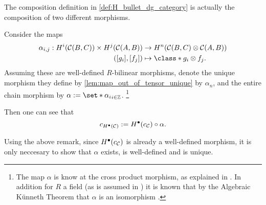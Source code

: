 \begin{remark}
    \label{rem:H_bullet_composition_alpha}
    The composition definition in \autoref{def:H_bullet_dg_category} is actually the composition of two different morphisms.

    Consider the maps
    \begin{align*}
        \alpha_{i, j}: H^i(\Cc(B, C)) \times H^j(\Cc(A, B)) &\to H^n(\Cc(B, C) \otimes \Cc(A, B)) \\
        ([g_i], [f_j]) &\mapsto \class*{g_i \otimes f_j}.
    \end{align*}
    Assuming these are well-defined \( R \)-bilinear morphisms, denote the unique morphism they define by \autoref{lem:map_out_of_tensor_unique} by \( \alpha_n \), and the entire chain morphism by \( \alpha := \set*{\alpha_i}_{i \in \Zb} \). \footnote{
        The map \( \alpha \) is know at the cross product morphism, as explained in \cite[p. 273]{Hatcher_2002}. In addition for \( R \) a field (as is assumed in \cite{Jasso-Muro_2023}) it is known that by the Algebraic Künneth Theorem that \( \alpha \) is an isomorphism \cite[Theorem 3B.5]{Hatcher_2002}.
    }
    
    Then one can see that
    \[
        c_{H^\bullet({\mathcal{C}})} := H^\bullet(c_{{\mathcal{C}}}) \circ \alpha.
    \] 
\end{remark}

Using the above remark, since \( H^{\bullet}(c_{{\mathcal{C}}}) \) is already a well-defined morphism, it is only neccesary to show that \( \alpha \) exists, is well-defined and is unique.

